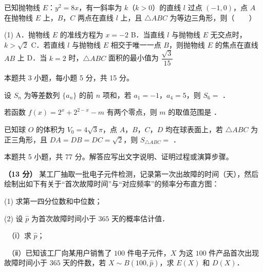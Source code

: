 已知抛物线 $E$：$y^2=8x$，有一斜率为 $k$（$k>0$）的直线 $l$ 过点 $(-1,0)$，点 $A$ 在抛物线 $E$ 上，$B$，$C$ 两点在直线 $l$ 上，且 $\triangle ABC$ 为等边三角形，则（　　）

\begin{gkopts}(1)
\task A．抛物线 $E$ 的准线方程为 $x=-2$
\task B．当直线 $l$ 与抛物线 $E$ 无交点时，$k>\sqrt{2}$
\task C．若直线 $l$ 与抛物线 $E$ 相交于唯一一点 $B$，则抛物线 $E$ 的焦点在直线 $AB$ 上
\task D．当 $k=2$ 时，$\triangle ABC$ 面积的最小值为 $\dfrac{\sqrt{3}}{15}$
\end{gkopts}

\par\medskip


\begin{gktip}
本题共 3 小题，每小题 5 分，共 15 分。
\end{gktip}

设 $S_n$ 为等差数列 $\{a_n\}$ 的前 $n$ 项和，若 $a_1=-1$，$a_4=5$，则 $S_6=$ \gkblank{}．

若函数 $f(x)=2^x+2^{2-x}-m$ 有两个零点，则 $m$ 的取值范围是 \gkblank{}．

已知球 $O$ 的体积为 $V_0=4\sqrt{3}\pi$，点 $A$，$B$，$C$，$D$ 均在球表面上，若 $\triangle ABC$ 为正三角形，且 $DA=DB=DC=\sqrt{2}$，则 $S_{\triangle ABC}=$ \gkblank{}．

\par\medskip


\begin{gktip}
本题共 5 小题，共 77 分。解答应写出文字说明、证明过程或演算步骤。
\end{gktip}

\textbf{（13 分）} 某工厂抽取一批电子元件检测，记录第一次出故障的时间（天），然后绘制出如下有关于“首次故障时间”与“对应频率”的频率分布直方图：

\begin{center}\end{center}

  (1) 求第一四分位数和中位数；

  (2) 设 $\hat{p}$ 为首次故障时间小于 $365$ 天的概率估计值．

  　（ⅰ）求 $\hat{p}$；

  　（ⅱ）已知该工厂向某用户销售了 $100$ 件电子元件，$X$ 为这 $100$ 件产品首次出现故障时间小于 $365$ 天的件数，若 $X\sim B(100,\hat{p})$，求 $E(X)$ 和 $D(X)$．

